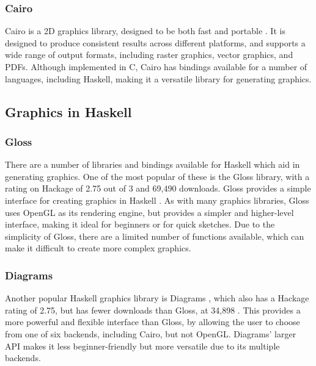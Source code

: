 \documentclass[../main.tex]{subfiles}
\begin{document}
            \subsubsection{Cairo}
                Cairo is a 2D graphics library, designed to be both fast and portable
                    \citep{cairo}.
                It is designed to produce consistent results across different platforms, and
                    supports a wide range of output formats, including raster graphics, vector
                    graphics, and PDFs.
                Although implemented in C, Cairo has bindings available for a number of
                    languages, including Haskell, making it a versatile library for generating
                    graphics.

        \subsection{Graphics in Haskell}
            \subsubsection{Gloss}
                There are a number of libraries and bindings available for Haskell which aid in
                    generating graphics.
                One of the most popular of these is the Gloss library, with a rating on Hackage
                    of 2.75 out of 3 and 69,490 downloads.
                Gloss provides a simple interface for creating graphics in Haskell
                    \citep{hackageGloss}.
                As with many graphics libraries, Gloss uses OpenGL as its rendering engine, but
                    provides a simpler and higher-level interface, making it ideal for beginners or
                    for quick sketches.
                Due to the simplicity of Gloss, there are a limited number of functions
                    available, which can make it difficult to create more complex graphics.

            \subsubsection{Diagrams}
                Another popular Haskell graphics library is Diagrams \citep{hackageDiagrams},
                    which also has a Hackage rating of 2.75, but has fewer downloads than Gloss, at
                    34,898 \citep{hackageDiagrams}.
                This provides a more powerful and flexible interface than Gloss, by allowing
                    the user to choose from one of six backends, including Cairo, but not OpenGL.
                Diagrams' larger API makes it less beginner-friendly but more versatile due to
                    its multiple backends.
\end{document}
